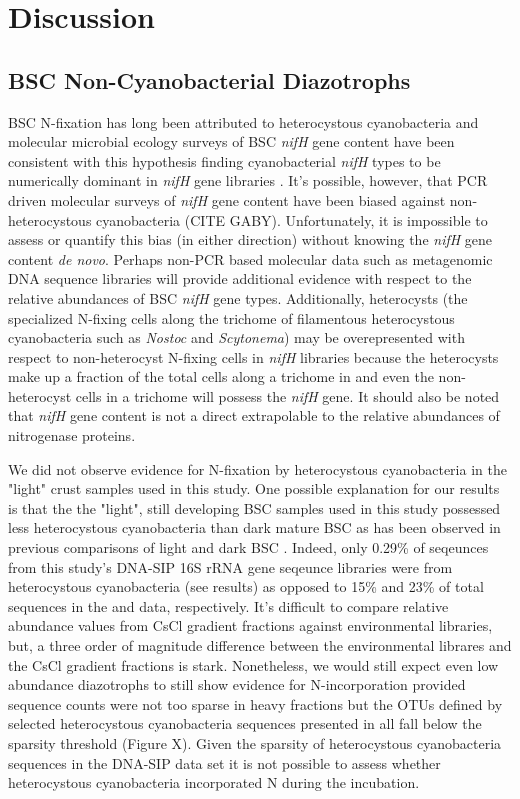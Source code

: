 \section{Discussion}

\subsection{BSC Non-Cyanobacterial Diazotrophs}
BSC N-fixation has long been attributed to heterocystous cyanobacteria and molecular microbial ecology surveys of BSC \textit{nifH} gene content have been consistent with this hypothesis finding cyanobacterial \textit{nifH} types to be numerically dominant in \textit{nifH} gene libraries \cite{Yeager, 14766579, Yeager_2012}. It's possible, however, that PCR driven molecular surveys of \textit{nifH} gene content have been biased against non-heterocystous cyanobacteria (CITE GABY). Unfortunately, it is impossible to assess or quantify this bias (in either direction) without knowing the \textit{nifH} gene content \textit{de novo}. Perhaps non-PCR based molecular data such as metagenomic DNA sequence libraries will provide additional evidence with respect to the relative abundances of BSC \textit{nifH} gene types. Additionally, heterocysts (the specialized N-fixing cells along the trichome of filamentous heterocystous cyanobacteria such as \textit{Nostoc} and \textit{Scytonema}) may be overepresented with respect to non-heterocyst N-fixing cells in \textit{nifH} libraries because the heterocysts make up a fraction of the total cells along a trichome in and even the non-heterocyst cells in a trichome will possess the \textit{nifH} gene. It should also be noted that \textit{nifH} gene content is not a direct extrapolable to the relative abundances of nitrogenase proteins.

We did not observe evidence for N-fixation by heterocystous cyanobacteria in the "light" crust samples used in this study. One possible explanation for our results is that the the "light", still developing BSC samples used in this study possessed less heterocystous cyanobacteria than dark mature BSC as has been observed in previous comparisons of light and dark BSC \cite{14766579}. Indeed, only 0.29\% of seqeunces from this study's DNA-SIP 16S rRNA gene seqeunce libraries were from heterocystous cyanobacteria (see results) as opposed to 15\% and 23\% of total sequences in the \citet{Steven_2013} and \citet{Garcia_Pichel_2013} data, respectively. It's difficult to compare relative abundance values from CsCl gradient fractions against environmental libraries, but, a three order of magnitude difference between the environmental librares and the CsCl gradient fractions is stark. Nonetheless, we would still expect even low abundance diazotrophs to still show evidence for N-incorporation provided sequence counts were not too sparse in heavy fractions but the OTUs defined by selected heterocystous cyanobacteria sequences presented in \citet{Yeager} all fall below the sparsity threshold (Figure X). Given the sparsity of heterocystous cyanobacteria sequences in the DNA-SIP data set it is not possible to assess whether heterocystous cyanobacteria incorporated N during the incubation.

